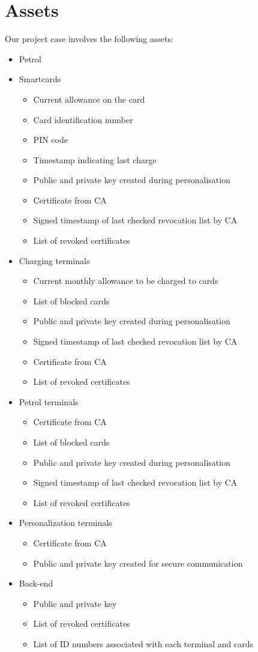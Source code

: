 \section{Assets}
Our project case involves the following assets:
\begin{itemize}
\item Petrol

\item Smartcards
\begin{itemize}
 \item Current allowance on the card
 \item Card identification number
 \item PIN code
 \item Timestamp indicating last charge
 \item Public and private key created during personalisation
 \item Certificate from CA
 \item Signed timestamp of last checked revocation list by CA
 \item List of revoked certificates
\end{itemize}

 \item Charging terminals
 \begin{itemize}
 	\item Current monthly allowance to be charged to cards
 	\item List of blocked cards
 	\item Public and private key created during personalisation
 	\item Signed timestamp of last checked revocation list by CA
  	\item Certificate from CA
	\item List of revoked certificates
 \end{itemize}

 
 \item Petrol terminals
 \begin{itemize}
  	\item Certificate from CA
 	\item List of blocked cards
 	\item Public and private key created during personalisation
 	\item Signed timestamp of last checked revocation list by CA
 	\item List of revoked certificates
 \end{itemize}

 
 \item Personalization terminals
 \begin{itemize}
	\item Certificate from CA
	\item Public and private key created for secure communication
 \end{itemize}

 
 \item Back-end
 \begin{itemize}
 	\item Public and private key
 	\item List of revoked certificates
 	\item List of ID numbers associated with each terminal and cards
 \end{itemize}

\end{itemize}
